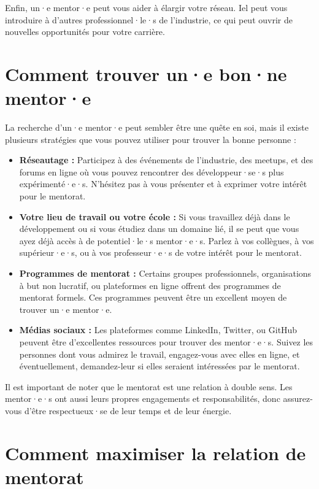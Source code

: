 Enfin, un·e mentor·e peut vous aider à élargir votre réseau. Iel peut vous introduire à d'autres professionnel·le·s de l'industrie, ce qui peut ouvrir de nouvelles opportunités pour votre carrière.

\section{Comment trouver un·e bon·ne mentor·e}

La recherche d'un·e mentor·e peut sembler être une quête en soi, mais il existe plusieurs stratégies que vous pouvez utiliser pour trouver la bonne personne :

\begin{itemize}
  \item \textbf{Réseautage :} Participez à des événements de l'industrie, des meetups, et des forums en ligne où vous pouvez rencontrer des développeur·se·s plus expérimenté·e·s. N'hésitez pas à vous présenter et à exprimer votre intérêt pour le mentorat.
  \item \textbf{Votre lieu de travail ou votre école :} Si vous travaillez déjà dans le développement ou si vous étudiez dans un domaine lié, il se peut que vous ayez déjà accès à de potentiel·le·s mentor·e·s. Parlez à vos collègues, à vos supérieur·e·s, ou à vos professeur·e·s de votre intérêt pour le mentorat.
  \item \textbf{Programmes de mentorat :} Certains groupes professionnels, organisations à but non lucratif, ou plateformes en ligne offrent des programmes de mentorat formels. Ces programmes peuvent être un excellent moyen de trouver un·e mentor·e.
  \item \textbf{Médias sociaux :} Les plateformes comme LinkedIn, Twitter, ou GitHub peuvent être d'excellentes ressources pour trouver des mentor·e·s. Suivez les personnes dont vous admirez le travail, engagez-vous avec elles en ligne, et éventuellement, demandez-leur si elles seraient intéressées par le mentorat.
\end{itemize}

Il est important de noter que le mentorat est une relation à double sens. Les mentor·e·s ont aussi leurs propres engagements et responsabilités, donc assurez-vous d'être respectueux·se de leur temps et de leur énergie.

\section{Comment maximiser la relation de mentorat}

